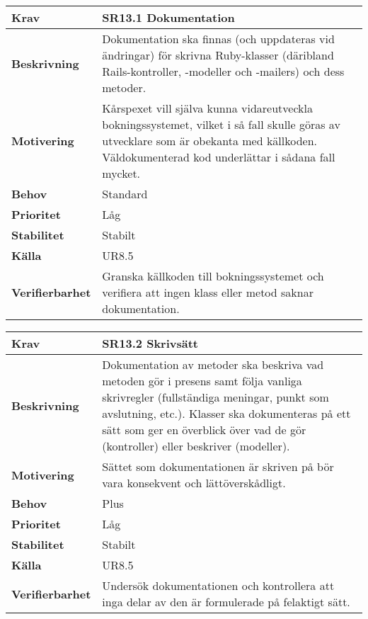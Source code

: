 \documentclass[a4paper, twoside, 11pt, titlepage]{article}
\begin{document}
\begin{tabular} { p{2.6cm} p{12.5cm} }
	\hline
	\sffamily\textbf{Krav} & \sffamily\textbf{SR13.1 Dokumentation } \\
	\hline
	\sffamily\textbf{Beskrivning} & Dokumentation ska finnas (och uppdateras vid ändringar) för skrivna Ruby-klasser (däribland Rails-kontroller, -modeller och -mailers) och dess metoder.  \\
	\hline
	\sffamily\textbf{Motivering} & Kårspexet vill själva kunna vidareutveckla bokningssystemet, vilket i så fall skulle göras av utvecklare som är obekanta med källkoden. Väldokumenterad kod underlättar i sådana fall mycket.  \\
	\hline
	\sffamily\textbf{Behov} & Standard  \\
	\hline
	\sffamily\textbf{Prioritet} & Låg  \\
	\hline
	\sffamily\textbf{Stabilitet} & Stabilt  \\
	\hline
	\sffamily\textbf{Källa} & UR8.5  \\
	\hline
	\sffamily\textbf{Verifierbarhet} & Granska källkoden till bokningssystemet och verifiera att ingen  klass eller metod saknar dokumentation.  \\
	\hline
\end{tabular}
\vspace{6mm}

\begin{tabular} { p{2.6cm} p{12.5cm} }
	\hline
	\sffamily\textbf{Krav} & \sffamily\textbf{SR13.2 Skrivsätt } \\
	\hline
	\sffamily\textbf{Beskrivning} & Dokumentation av metoder ska beskriva vad metoden gör i presens samt följa vanliga skrivregler (fullständiga meningar, punkt som avslutning, etc.). Klasser ska dokumenteras på ett sätt som ger en överblick över vad de gör (kontroller) eller beskriver (modeller).  \\
	\hline
	\sffamily\textbf{Motivering} & Sättet som dokumentationen är skriven på bör vara konsekvent och lättöverskådligt.  \\
	\hline
	\sffamily\textbf{Behov} & Plus  \\
	\hline
	\sffamily\textbf{Prioritet} & Låg  \\
	\hline
	\sffamily\textbf{Stabilitet} & Stabilt  \\
	\hline
	\sffamily\textbf{Källa} & UR8.5  \\
	\hline
	\sffamily\textbf{Verifierbarhet} & Undersök dokumentationen och kontrollera att inga delar av den är formulerade på felaktigt sätt.  \\
	\hline
\end{tabular}
\end{document}
